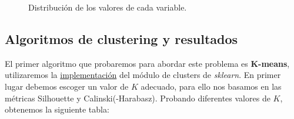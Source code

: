 \documentclass[oneside]{book}
\begin{document}
\begin{figure}[H]
  \centering
  \caption{Distribución de los valores de cada variable.}
  \label{fig:ward1-scores}
\end{figure}

\subsection{Algoritmos de clustering y resultados}

El primer algoritmo que probaremos para abordar este problema es
\textbf{K-means}, utilizaremos la
\href{https://scikit-learn.org/stable/modules/generated/sklearn.cluster.KMeans.html}{implementación}
del módulo de clusters de \textit{sklearn}. En primer lugar debemos
escoger un valor de $K$ adecuado, para ello nos basamos en las
métricas Silhouette y Calinski(-Harabasz). Probando diferentes valores
de $K$, obtenemos la siguiente tabla:
\end{document}
